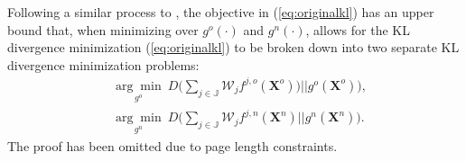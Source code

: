 \documentclass[journal]{IEEEtran}
\newcommand{\setX}{\mathbf{X}}
\begin{document}
Following a similar process to \cite[Section III.A]{variational}, the objective in (\ref{eq:originalkl}) has an upper bound that, when minimizing over $g^o(\cdot)$ and $g^n(\cdot)$, allows for the KL divergence minimization (\ref{eq:originalkl}) to be broken down into two separate KL divergence minimization problems:
\begin{subequations}
\begin{align}
    & \underset{g^o}{\arg\min}~D\bigg( \sum_{j\in\mathbb{J}} \mathcal{W}_j f^{j,o} (\setX^o)) || g^o(\setX^o) \bigg), \\
    & \underset{g^n}{\arg\min}~D\bigg( \sum_{{j\in\mathbb{J}}} \mathcal{W}_j f^{j,n} (\setX^n) || g^n(\setX^n)  \bigg).
\end{align}
\end{subequations}
The proof has been omitted due to page length constraints. 


\end{document}
